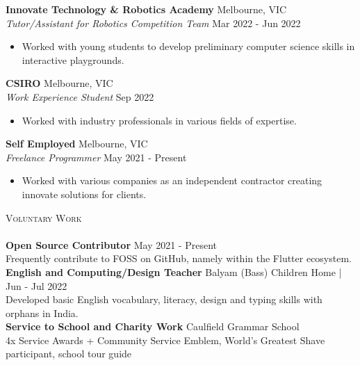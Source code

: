 \documentclass[a4paper]{article}
\newcommand{\lineunder} {
    \vspace*{-8pt} \\
    \hspace*{-18pt} \hrulefill \\
}
\newcommand{\header} [1] {
    {\hspace*{-18pt}\vspace*{6pt} \textsc{#1}}
    \vspace*{-6pt} \lineunder
}
\begin{document}
\textbf{Innovate Technology \& Robotics Academy} \hfill Melbourne, VIC\\
\textit{Tutor/Assistant for Robotics Competition Team} \hfill Mar 2022 - Jun 2022\\
\vspace{-1mm}
\begin{itemize} \itemsep 1pt
	\item Worked with young students to develop preliminary computer science skills in interactive playgrounds.
\end{itemize}
\textbf{CSIRO} \hfill Melbourne, VIC\\
\textit{Work Experience Student} \hfill Sep 2022\\
\vspace{-1mm}
\begin{itemize} \itemsep 1pt
	\item Worked with industry professionals in various fields of expertise.
\end{itemize}
\textbf{Self Employed} \hfill Melbourne, VIC\\
\textit{Freelance Programmer} \hfill May 2021 - Present\\
\vspace{-1mm}
\begin{itemize} \itemsep 1pt
	\item Worked with various companies as an independent contractor creating innovate solutions for clients.
\end{itemize}

\header{Voluntary Work}
{\textbf{Open Source Contributor}} \hfill May 2021 - Present\\
Frequently contribute to FOSS on GitHub, namely within the Flutter ecosystem.\\
\vspace*{2mm}
{\textbf{English and Computing/Design Teacher}} \hfill Balyam (Bass) Children Home | Jun - Jul 2022\\
Developed basic English vocabulary, literacy, design and typing skills with orphans in India. \\
\vspace*{2mm}
{\textbf{Service to School and Charity Work}} \hfill Caulfield Grammar School\\
4x Service Awards + Community Service Emblem, World's Greatest Shave participant, school tour guide\\
\vspace*{2mm}
\end{document}
